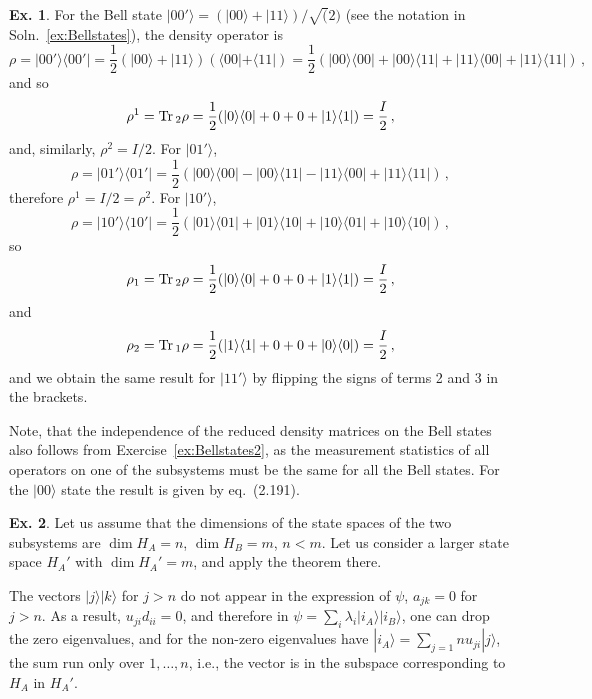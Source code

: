 \documentclass[a4paper,12pt]{article}
\def\Tr{\ensuremath{\mathop{\rm Tr}}{}}
\theoremstyle{definition}
\newtheorem{exercise}{Ex.}[section]
\begin{document}
\begin{exercise}
 For the Bell state $|00'\rangle = (|00\rangle + |11\rangle)/\sqrt(2)$ (see the notation in Soln.~\ref{ex:Bellstates}), the density operator is
 \[
  \rho = |00'\rangle\langle00'| = \frac{1}{2}(|00\rangle + |11\rangle)(\langle 00|+\langle 11|) = \frac{1}{2}(|00\rangle\langle 00| + |00\rangle\langle 11| + |11\rangle \langle 00| + |11\rangle\langle 11|)\,,
 \]
 and so
 \[
  \rho^1 = \Tr_2\rho = \frac{1}{2}(|0\rangle\langle 0| + 0 + 0 + |1\rangle\langle 1|)= \frac{I}{2}\,,
 \]
 and, similarly, $\rho^2 = I/2$. For $|01'\rangle$,
 \[
  \rho = |01'\rangle\langle 01'| = \frac{1}{2}(|00\rangle\langle 00| - |00\rangle\langle 11| - |11\rangle\langle 00| + |11\rangle\langle 11|)\,,
 \]
 therefore $\rho^1=I/2 = \rho^2$. For $|10'\rangle$,
 \[
  \rho = |10'\rangle\langle10'| = \frac{1}{2}(|01\rangle\langle 01| + |01\rangle\langle 10| + |10\rangle\langle 01| + |10\rangle\langle 10|)\,,
 \]
 so
 \[
  \rho_1 = \Tr_2 \rho = \frac{1}{2}(|0\rangle\langle 0| + 0 + 0 + |1\rangle\langle 1|) = \frac{I}{2}\,,
 \]
 and
 \[
  \rho_2 = \Tr_1 \rho = \frac{1}{2}(|1\rangle\langle 1| + 0 + 0 + |0\rangle\langle 0|) = \frac{I}{2}\,,
 \]
 and we obtain the same result for $|11'\rangle$ by flipping the signs of terms 2 and 3 in the brackets.

 Note, that the independence of the reduced density matrices on the Bell states also follows from Exercise~\ref{ex:Bellstates2}, as the measurement statistics of all operators on one of the subsystems must be the same for all the Bell states. For the $|00\rangle$ state the result is given by eq.\ (2.191).
\end{exercise}

\begin{exercise}
 Let us assume that the dimensions of the state spaces of the two subsystems are $\dim H_A = n$, $\dim H_B = m$, $n < m$. Let us consider a larger state space $H_A'$ with $\dim H_A' = m$, and apply the theorem there.
 
 The vectors $|j\rangle|k\rangle$ for $j>n$ do not appear in the expression of $\psi$, $a_{jk} = 0$ for $j>n$. As a result, $u_{ji}d_{ii} = 0$, and therefore in $\psi = \sum_i \lambda_i |i_A\rangle |i_B\rangle$, one can drop the zero eigenvalues, and for the non-zero eigenvalues have $|i_A\rangle = \sum_{j=1}{n} u_{ji}|j\rangle$, the sum run only over $1, \dots, n$, i.e., the vector is in the subspace corresponding to $H_A$ in $H_A'$.
\end{exercise}
\end{document}
